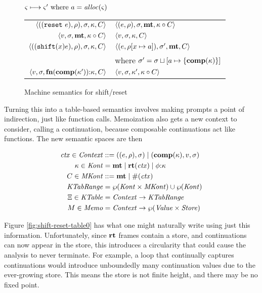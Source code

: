 \begin{figure}
  \centering
  $\varsigma \longmapsto \varsigma' \text{ where } a = \mathit{alloc}(\varsigma)$ \\
  \begin{tabular}{r|l}
    \hline
    $\langle ((\texttt{reset}\ e), \rho), \sigma, \kappa, C \rangle$
    &
    $\langle (e, \rho), \sigma, \mathbf{mt}, \kappa\circ C \rangle$
    \\
    $\langle v, \sigma, \mathbf{mt}, \kappa\circ C \rangle$
    &
    $\langle v, \sigma, {\kappa}, {C} \rangle$
    \\
    $\langle ((\texttt{shift} (x) e), \rho), \sigma, \kappa, C \rangle$
    &
    $\langle (e, \rho[x \mapsto a]), \sigma',\mathbf{mt},C \rangle$
    \\ & where $\sigma' = \sigma\sqcup[a \mapsto \{ \mathbf{comp}(\kappa) \}]$
    \\
    $\langle v,\sigma,\mathbf{fn}{}(\mathbf{comp}(\kappa')){\tt :} \kappa, C \rangle$
    &
    $\langle v, \sigma, \kappa', \kappa\circ C \rangle$
  \end{tabular}  
  \caption{Machine semantics for shift/reset}
  \label{fig:shift-reset}
\end{figure}

Turning this into a table-based semantics involves making prompts a point of indirection, just like function calls.
%
Memoization also gets a new context to consider, calling a continuation, because composable continuations act like functions.
%
The new semantic spaces are then

\begin{align*}
  \mathit{ctx} \in \mathit{Context} &::= ((e,\rho),\sigma) \mid (\mathbf{comp}(\kappa),v,\sigma) \\
  \kappa \in \mathit{Kont} &= \mathbf{mt} \mid \mathbf{rt}(\mathit{ctx}) \mid \phi{\tt :} \kappa \\
  C \in \mathit{MKont} &::= \mathbf{mt} \mid \#(\mathit{ctx}) \\
  \mathit{KTabRange} &= \wp(\mathit{Kont} \times \mathit{MKont}) \cup \wp(\mathit{Kont}) \\
  \Xi \in \mathit{KTable} &= \mathit{Context} \to \mathit{KTabRange} \\
  M \in \mathit{Memo} &= \mathit{Context} \to \wp(\mathit{Value} \times \mathit{Store})
\end{align*}

Figure \ref{fig:shift-reset-table0} has what one might naturally write using just this information.
%
Unfortunately, since $\mathbf{rt}$ frames contain a store, and continuations can now appear in the store, this introduces a circularity that could cause the analysis to never terminate.
%
For example, a loop that continually captures continuations would introduce unboundedly many continuation values due to the ever-growing store.
%
This means the store is not finite height, and there may be no fixed point.

